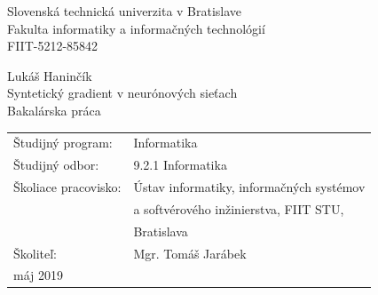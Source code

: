 \documentclass[12pt, twoside]{book}
\def\mfrok{2018}
\def\mfnazov{Syntetický gradient v neurónových sieťach}
\def\mftyp{Bakalárska práca}
\def\mfautor{Lukáš Haninčík}
\def\mfskolitel{Mgr. Tomáš Jarábek}
\def\mfkonzultant{tit. Meno Priezvisko, tit. }
\def\mfodbor{9.2.1 Informatika}
\def\program{ Informatika }
\def\mfpracovisko{ Ústav informatiky, informačných systémov \\ 
& a softvérového inžinierstva, FIIT STU, \\
& Bratislava }
\begin{document}
\frontmatter

\thispagestyle{empty}
\noindent

\begin{center}
\large
Slovenská technická univerzita v Bratislave\\
Fakulta informatiky a informačných technológií\\
\vspace{3mm}
FIIT-5212-85842

\vfill
Lukáš Haninčík \\
\vspace{8mm}
{\sc\LARGE\mfnazov}\\
\vspace{8mm}
\mftyp
\end{center}

\vfill

\noindent
\begin{tabular}{ll}
Študijný program: & \program \\
Študijný odbor: & \mfodbor \\
Školiace pracovisko: & \mfpracovisko \\
Školiteľ: & \mfskolitel \\
máj 2019
\end{tabular}
\end{document}
